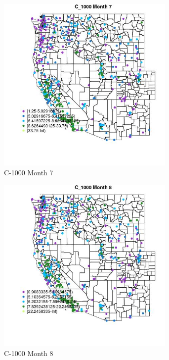 \begin{figure} 
\centering  
\includegraphics[width=0.77\textwidth]{Code_Outputs/ML_input_report_ML_input_PM25_Step5_part_d_de_duplicated_aves_ML_input_MapObsMo7C_1000.jpg} 
\caption{\label{fig:ML_input_report_ML_input_PM25_Step5_part_d_de_duplicated_aves_ML_inputMapObsMo7C_1000}C-1000 Month 7} 
\end{figure} 
 

\clearpage 

\begin{figure} 
\centering  
\includegraphics[width=0.77\textwidth]{Code_Outputs/ML_input_report_ML_input_PM25_Step5_part_d_de_duplicated_aves_ML_input_MapObsMo8C_1000.jpg} 
\caption{\label{fig:ML_input_report_ML_input_PM25_Step5_part_d_de_duplicated_aves_ML_inputMapObsMo8C_1000}C-1000 Month 8} 
\end{figure} 
 

